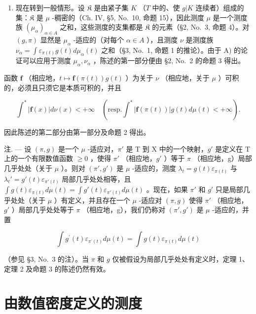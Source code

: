 \begin{enumerate}
\def\labelenumi{\Alph{enumi})}
\setcounter{enumi}{1}
\tightlist
\item
  现在转到一般情形。设 \(\mathfrak{K}\) 是由紧子集 \(K\) （\(T\) 中的、使 \(g|K\) 连续者）组成的集：\(\mathfrak{K}\) 是 \(\mu\) -稠密的（Ch. IV, §5, No.~10, 命题 15），因此测度 \(\mu\) 是一个测度族 \((\mu_{\alpha})_{\alpha \in A}\) 之和，这些测度的支集都是 \(\mathfrak{K}\) 的元素（§2, No.~3, 命题 4）。对 \((g,\pi)\) 显然是 \(\mu_{\alpha}\) -适应的（对每个 \(\alpha \in A\) ），且测度 \(\nu\) 是测度族 \(\nu_{\alpha} = \int \varepsilon_{\pi(t)} g(t) d\mu_{\alpha}(t)\) 之和（§3, No.~1, 命题 1 的推论）。由于 A) 的论证可以应用于测度 \(\mu_{\alpha}, \nu_{\alpha}\) ，陈述的第一部分便由 §2, No.~2 的命题 3 得出。
\end{enumerate}

函数 \(\mathbf{f}\) （相应地，\(t\mapsto \mathbf{f}(\pi (t))g(t)\) ）为关于 \(\nu\) （相应地，关于 \(\mu\) ）可积的，必须且只须它是本质可积的，并且

\[
\int^ {*} | \mathbf {f} (x) | d \nu (x) <   + \infty \quad (\mathrm{resp.} \int^ {*} | \mathbf {f} (\pi (t)) | g (t) d \mu (t) <   + \infty).
\]

因此陈述的第二部分由第一部分及命题 2 得出。

注. --- 设 \((\pi, g)\) 是一个 \(\mu\) -适应对，\(\pi'\) 是 T 到 X 中的一个映射，\(g'\) 是定义在 T 上的一个有限数值函数 \(\geqslant 0\) ，使得 \(\pi'\) （相应地，\(g'\) ）等于 \(\pi\) （相应地，g）局部几乎处处（关于 \(\mu\) ）。则对 \((\pi', g')\) 是 \(\mu\) -适应的，测度 \(\lambda_t = g(t)\varepsilon_{\pi(t)}\) 与 \(\lambda_t' = g'(t)\varepsilon_{\pi'(t)}\) 局部几乎处处相等，且 \(\int g(t)\varepsilon_{\pi(t)} d\mu(t) = \int g'(t)\varepsilon_{\pi'(t)} d\mu(t)\) 。现在，如果 \(\pi'\) 和 \(g'\) 只是局部几乎处处（关于 \(\mu\) ）有定义，并且存在一个 \(\mu\) -适应对 \((\pi, g)\) 使得 \(\pi'\) （相应地，\(g'\) ）局部几乎处处等于 \(\pi\) （相应地，g），我们仍称对 \((\pi', g')\) 是 \(\mu\) -适应的，并置

\[
\int g ^ {\prime} (t) \varepsilon_ {\pi^ {\prime} (t)} d \mu (t) = \int g (t) \varepsilon_ {\pi (t)} d \mu (t)
\]

（参见 §3, No.~3 的注）。当 \(\pi\) 和 \(g\) 仅被假设为局部几乎处处有定义时，定理 1、定理 2 及命题 3 的陈述仍然有效。

\section{由数值密度定义的测度}

